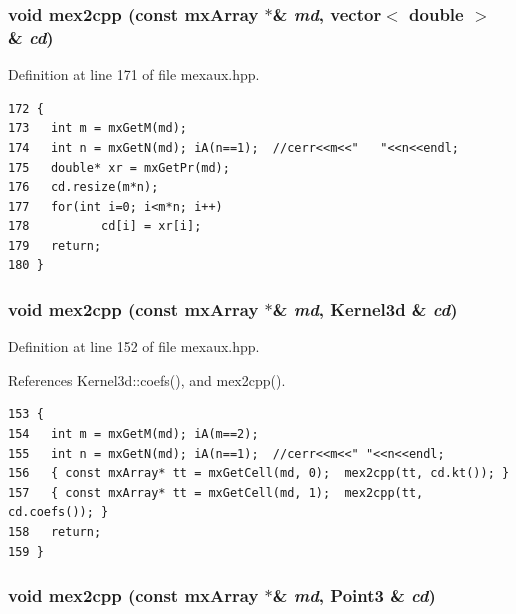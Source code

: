 \subsubsection{\setlength{\rightskip}{0pt plus 5cm}void mex2cpp (const mx\-Array $\ast$\& {\em md}, vector$<$ double $>$ \& {\em cd})\hspace{0.3cm}{\tt  [inline]}}\label{mexaux_8hpp_3ec11ea685391c2450ffaf873efaa5f1_3ec11ea685391c2450ffaf873efaa5f1}




Definition at line 171 of file mexaux.hpp.

\footnotesize\begin{verbatim}172 {
173   int m = mxGetM(md);
174   int n = mxGetN(md); iA(n==1);  //cerr<<m<<"   "<<n<<endl;
175   double* xr = mxGetPr(md);
176   cd.resize(m*n);
177   for(int i=0; i<m*n; i++)
178          cd[i] = xr[i];
179   return;
180 }
\end{verbatim}\normalsize 


\subsubsection{\setlength{\rightskip}{0pt plus 5cm}void mex2cpp (const mx\-Array $\ast$\& {\em md}, {\bf Kernel3d} \& {\em cd})\hspace{0.3cm}{\tt  [inline]}}\label{mexaux_8hpp_8e1ec12abf3736c237171483c47cf737_8e1ec12abf3736c237171483c47cf737}




Definition at line 152 of file mexaux.hpp.

References Kernel3d::coefs(), and mex2cpp().

\footnotesize\begin{verbatim}153 {
154   int m = mxGetM(md); iA(m==2);
155   int n = mxGetN(md); iA(n==1);  //cerr<<m<<" "<<n<<endl;
156   { const mxArray* tt = mxGetCell(md, 0);  mex2cpp(tt, cd.kt()); }
157   { const mxArray* tt = mxGetCell(md, 1);  mex2cpp(tt, cd.coefs()); }
158   return;
159 }
\end{verbatim}\normalsize 


\subsubsection{\setlength{\rightskip}{0pt plus 5cm}void mex2cpp (const mx\-Array $\ast$\& {\em md}, Point3 \& {\em cd})\hspace{0.3cm}{\tt  [inline]}}\label{mexaux_8hpp_c7567e5c665bde526d264538edf840b5_c7567e5c665bde526d264538edf840b5}





